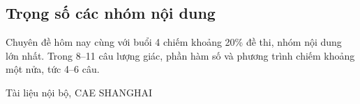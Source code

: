 \documentclass[11pt, a4paper]{article}
\begin{document}
\subsection{Trọng số các nhóm nội dung}


Chuyên đề hôm nay cùng với buổi 4 chiếm khoảng 20\% đề thi, nhóm nội dung lớn nhất. Trong 8–11 câu lượng giác, phần hàm số và phương trình chiếm khoảng một nửa, tức 4–6 câu.
\vspace{0.8cm}
\begin{center}
{\footnotesize\color{cae_blue} Tài liệu nội bộ, CAE SHANGHAI}
\end{center}
\end{document}
